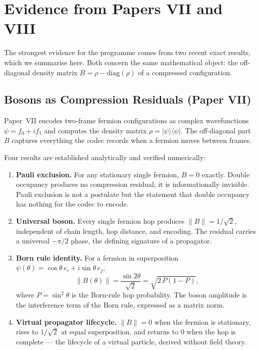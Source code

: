 \documentclass[11pt]{article}
\begin{document}
\section{Evidence from Papers VII and VIII}
\label{sec:evidence}

The strongest evidence for the programme comes from two recent exact
results, which we summarise here.
Both concern the same mathematical object: the off-diagonal density
matrix $B = \rho - \mathrm{diag}(\rho)$ of a compressed configuration.

\subsection{Bosons as Compression Residuals (Paper VII)}

Paper~VII \cite{meskanen2026vii} encodes two-frame fermion
configurations as complex wavefunctions $\psi = f_0 + if_1$ and
computes the density matrix $\rho = |\psi\rangle\langle\psi|$.
The off-diagonal part $B$ captures everything the codec records when a
fermion moves between frames.

Four results are established analytically and verified numerically:

\begin{enumerate}
  \item \textbf{Pauli exclusion.}
        For any stationary single fermion, $B = 0$ exactly.
        Double occupancy produces no compression residual; it is
        informationally invisible.
        Pauli exclusion is not a postulate but the statement that
        double occupancy has nothing for the codec to encode.

  \item \textbf{Universal boson.}
        Every single fermion hop produces $\|B\| = 1/\sqrt{2}$,
        independent of chain length, hop distance, and encoding.
        The residual carries a universal $-\pi/2$ phase, the defining
        signature of a propagator.

  \item \textbf{Born rule identity.}
        For a fermion in superposition
        $\psi(\theta) = \cos\theta\,e_i + i\sin\theta\,e_j$,
        \begin{equation}
          \|B(\theta)\| = \frac{\sin 2\theta}{\sqrt{2}}
                        = \sqrt{2\,P(1-P)},
          \label{eq:born}
        \end{equation}
        where $P = \sin^2\theta$ is the Born-rule hop probability.
        The boson amplitude is the interference term of the Born rule,
        expressed as a matrix norm.

  \item \textbf{Virtual propagator lifecycle.}
        $\|B\| = 0$ when the fermion is stationary, rises to
        $1/\sqrt{2}$ at equal superposition, and returns to $0$ when
        the hop is complete --- the lifecycle of a virtual particle,
        derived without field theory.
\end{enumerate}
\end{document}
